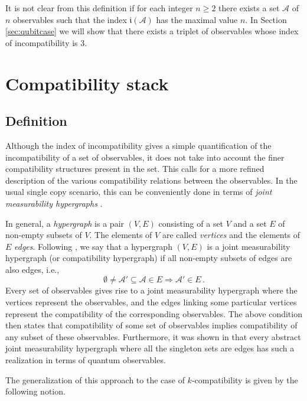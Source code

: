 \documentclass[12pt]{amsart}
\theoremstyle{definition}
\newcommand{\ind}[1]{\mathfrak{i}(#1)}
\begin{document}
It is not clear from this definition if for each integer $n\geq 2$ there exists a set $\mathcal{A}$ of $n$ observables such that the index $\ind{\mathcal{A}}$ has the maximal value $n$. 
In Section \ref{sec:qubitcase} we will show that there exists a triplet of observables whose index of incompatibility is $3$.




\section{Compatibility stack}
\label{sec:stack}

\subsection{Definition}
Although the index of incompatibility gives a simple quantification of the incompatibility of a set of observables, it does not take into account the finer compatibility structures present in the set. This calls for a more refined description of the various compatibility relations between the observables. In the usual single copy scenario, this can be conveniently done in terms of \emph{joint measurability hypergraphs} \cite{KuHeFr14}. 

In general, a \emph{hypergraph} is a pair $(V,E)$ consisting of a set $V$ and a set $E$ of non-empty subsets of $V$.
The elements of $V$ are called \emph{vertices} and the elements of $E$ \emph{edges}. 
Following \cite{KuHeFr14}, we say that a hypergraph $(V,E)$ is a joint measurability hypergraph (or compatibility hypergraph) if all non-empty subsets of edges are also edges, i.e.,
\begin{equation*}
\emptyset \neq \mathcal{A}' \subseteq \mathcal{A} \in E \Rightarrow \mathcal{A}' \in E \, .
\end{equation*}
Every set of observables gives rise to a joint measurability hypergraph where the vertices represent the observables, and the edges linking some particular vertices represent the compatibility of the corresponding observables.  The above condition then states that compatibility of some set of observables implies compatibility of any subset of these observables. 
Furthermore, it was shown in \cite{KuHeFr14} that every abstract joint measurability hypergraph where all the singleton sets are edges has such a realization in terms of quantum observables. 


The generalization of this approach to the case of $k$-compatibility is given by the following notion.
\end{document}
